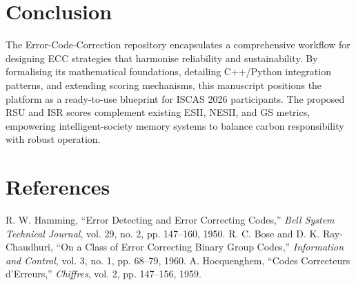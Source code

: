 \documentclass[conference]{IEEEtran}
\begin{document}
\section{Conclusion}
The Error-Code-Correction repository encapsulates a comprehensive workflow for designing ECC strategies that harmonise reliability and sustainability.
By formalising its mathematical foundations, detailing C++/Python integration patterns, and extending scoring mechanisms, this manuscript positions the platform as a ready-to-use blueprint for ISCAS 2026 participants.
The proposed RSU and ISR scores complement existing ESII, NESII, and GS metrics, empowering intelligent-society memory systems to balance carbon responsibility with robust operation.
\section*{References}
\begin{thebibliography}{1}
 R. W. Hamming, ``Error Detecting and Error Correcting Codes,'' \emph{Bell System Technical Journal}, vol. 29, no. 2, pp. 147--160, 1950.
 R. C. Bose and D. K. Ray-Chaudhuri, ``On a Class of Error Correcting Binary Group Codes,'' \emph{Information and Control}, vol. 3, no. 1, pp. 68--79, 1960.
 A. Hocquenghem, ``Codes Correcteurs d'Erreurs,'' \emph{Chiffres}, vol. 2, pp. 147--156, 1959.
\end{thebibliography}
\end{document}
